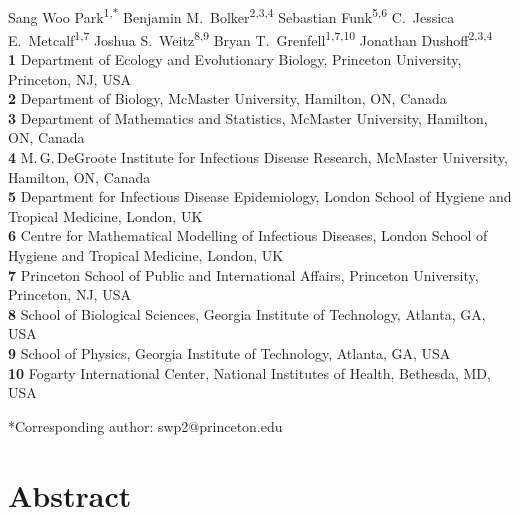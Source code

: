 \documentclass[12pt]{article}
\date{\today}
\begin{document}
\begin{flushleft}{
	\Large
	\textbf{}
}
\\
Sang Woo Park\textsuperscript{1,*}
Benjamin M.\ Bolker\textsuperscript{2,3,4}
Sebastian Funk\textsuperscript{5,6}
C.\ Jessica E.\ Metcalf\textsuperscript{1,7}
Joshua S.\ Weitz\textsuperscript{8,9}
Bryan T.\ Grenfell\textsuperscript{1,7,10}
Jonathan Dushoff\textsuperscript{2,3,4}
\\
\bigskip
\textbf{1} Department of Ecology and Evolutionary Biology, Princeton University, Princeton, NJ, USA
\\
\textbf{2} Department of Biology, McMaster University, Hamilton, ON, Canada
\\
\textbf{3} Department of Mathematics and Statistics, McMaster University, Hamilton, ON, Canada
\\
\textbf{4} M.\,G.\,DeGroote Institute for Infectious Disease Research, McMaster University, Hamilton, ON, Canada
\\
\textbf{5} Department for Infectious Disease Epidemiology, London School of Hygiene and Tropical Medicine, London, UK
\\
\textbf{6} Centre for Mathematical Modelling of Infectious Diseases, London School of Hygiene and Tropical Medicine, London, UK
\\
\textbf{7} Princeton School of Public and International Affairs, Princeton University, Princeton, NJ, USA
\\
\textbf{8} School of Biological Sciences, Georgia Institute of Technology, Atlanta, GA, USA
\\
\textbf{9} School of Physics, Georgia Institute of Technology, Atlanta, GA, USA
\\
\textbf{10} Fogarty International Center, National Institutes of Health, Bethesda, MD, USA
\\
\bigskip

*Corresponding author: swp2@princeton.edu
\bigskip

\end{flushleft}


\section*{Abstract}
\end{document}
